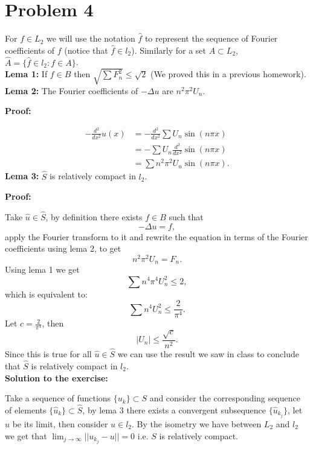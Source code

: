 \documentclass{article}
\begin{document}
\section{Problem 4}
For $f\in L_2$ we will use the notation	$\hat f$ to represent the sequence of
Fourier coefficients of $f$ (notice that $\hat f\in l_2$). Similarly for a set
$A\subset L_2$, $\hat A=\{\hat f\in l_2:f\in A\}$.\\
\textbf{Lema 1:} If $f\in B$ then $\sqrt{\sum F_n^2}\leq \sqrt{2}$ (We proved
this in a previous
homework).\\
\textbf{Lema 2:} The Fourier coefficients of $-\Delta u$ are $n^2\pi^2 U_n$.

\textbf{Proof:}

\begin{align*}
	-\frac{d^2}{dx^2}u(x) &= -\frac{d^2}{dx^2}\sum U_n\sin(n\pi x)\\
			      &= -\sum U_n\frac{d^2}{dx^2}\sin(n\pi x)\\
	&= \sum n^2\pi^2U_n\sin(n\pi x).
\end{align*}
\textbf{Lema 3:} $\hat S$ is relatively compact in $l_2$.

\textbf{Proof:}

Take $\hat u\in \hat S$, by definition there exists $f\in B$ such that
\[
	-\Delta u =f,
\]
apply the Fourier transform to it and rewrite the equation in terms
of the Fourier coefficients using lema 2, to get
\[
	n^2\pi^2U_n = F_n.
\]
Using lema 1 we get
\[
	\sum n^4\pi^4U_n^2\leq 2,
\]
which is equivalent to:
\[
\sum n^4U_n^2\leq \frac{2}{\pi^4}.
\]
Let $c=\frac{2}{\pi^4}$, then
\[
	|U_n|\leq \frac{\sqrt{c}}{n^2}.
\]
Since this is true for all $\hat u\in \hat S$ we can use the result
we saw in class to conclude that $\hat S$ is relatively compact in $l_2$.\\
\textbf{Solution to the exercise:}

Take a sequence of functions $\{u_k\}\subset S$ and consider the
corresponding sequence of elements $\{\hat u_k\}\subset \hat S$, by lema 3
there exists a convergent subsequence $\{\hat u_{k_j}\}$, let $\hat u$ be its
limit, then consider $u\in l_2$. By the isometry we have between $L_2$ and $l_2$
we get that $\lim_{j\to \infty}||u_{k_j}-u||=0$ i.e. $S$ is relatively compact.
\end{document}
